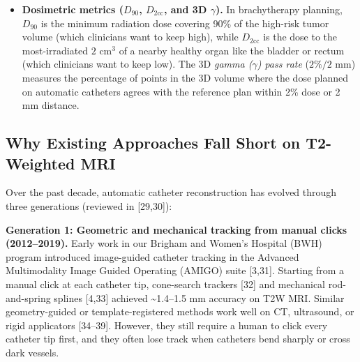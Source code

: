 \documentclass[
  11pt,
]{article}
\begin{document}
\begin{itemize}
  tuning (via an internal 80/20 split or 5-fold inner cross-fitting),
  and the remaining 10 or 11 patients are held in a locked vault and
  evaluated \emph{once}. Every patient is thus evaluated strictly
  ``out-of-fold'' (as an unseen patient).
\item
  \textbf{Dosimetric metrics (\(D_{90}\), \(D_{2\text{cc}}\), and 3D
  \(\gamma\)).} In brachytherapy planning, \(D_{90}\) is the minimum
  radiation dose covering 90\% of the high-risk tumor volume (which
  clinicians want to keep high), while \(D_{2\text{cc}}\) is the dose to
  the most-irradiated \(2\text{ cm}^3\) of a nearby healthy organ like
  the bladder or rectum (which clinicians want to keep low). The 3D
  \emph{gamma (\(\gamma\)) pass rate} (\(2\%/2\text{ mm}\)) measures the
  percentage of points in the 3D volume where the dose planned on
  automatic catheters agrees with the reference plan within 2\% dose or
  2 mm distance.
\end{itemize}

\subsection{Why Existing Approaches Fall Short on T2-Weighted
MRI}\label{why-existing-approaches-fall-short-on-t2-weighted-mri}

Over the past decade, automatic catheter reconstruction has evolved
through three generations (reviewed in {[}29,30{]}):

\textbf{Generation 1: Geometric and mechanical tracking from manual
clicks (2012--2019).} Early work in our Brigham and Women's Hospital
(BWH) program introduced image-guided catheter tracking in the Advanced
Multimodality Image Guided Operating (AMIGO) suite {[}3,31{]}. Starting
from a manual click at each catheter tip, cone-search trackers {[}32{]}
and mechanical rod-and-spring splines {[}4,33{]} achieved
\textasciitilde1.4--1.5 mm accuracy on T2W MRI. Similar geometry-guided
or template-registered methods work well on CT, ultrasound, or rigid
applicators {[}34--39{]}. However, they still require a human to click
every catheter tip first, and they often lose track when catheters bend
sharply or cross dark vessels.
\end{document}
